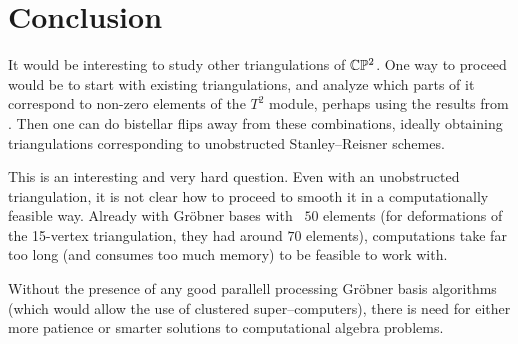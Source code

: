 \section{Conclusion}

It would be interesting to study other triangulations of $\mathbb{C} \mathbb{P}^2$. One way to proceed would be to start with existing triangulations, and analyze which parts of it correspond to non-zero elements of the $T^2$ module, perhaps using the results from \cite{deforming_christophersen}. Then one can do bistellar flips away from these combinations, ideally obtaining triangulations corresponding to unobstructed Stanley--Reisner schemes.

This is an interesting and very hard question. Even with an unobstructed triangulation, it is not clear how to proceed to smooth it in a computationally feasible way. Already with Gröbner bases with ~$50$ elements (for deformations of the 15-vertex triangulation, they had around $70$ elements), computations take far too long (and consumes too much memory) to be feasible to work with.

Without the presence of any good parallell processing Gröbner basis algorithms (which would allow the use of clustered super--computers), there is need for either more patience or smarter solutions to computational algebra problems.